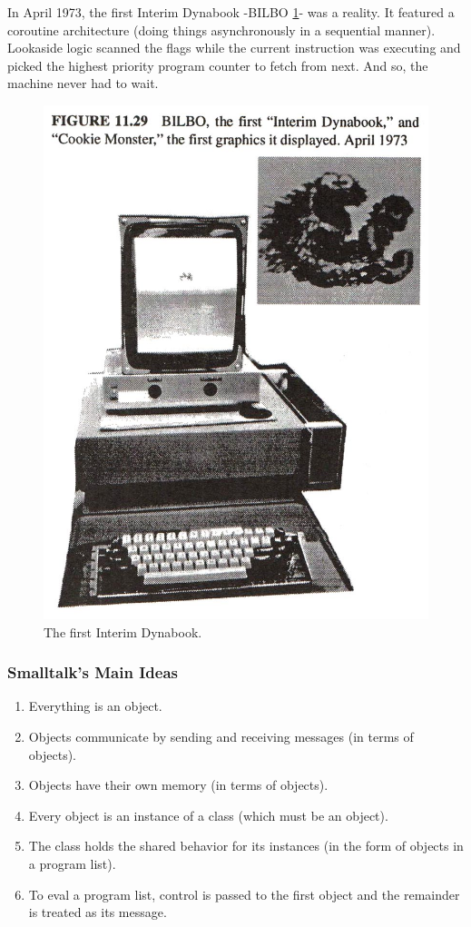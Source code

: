 \documentclass[letterpaper,12pt,parskip=full]{article}
\begin{document}
In April 1973, the first Interim Dynabook -BILBO \ref{fig:bilbo}- was a reality. It featured a coroutine architecture (doing things asynchronously in a sequential manner). Lookaside logic scanned the flags while the current instruction was executing and picked the highest priority program counter to fetch from next. And so, the machine never had to wait.
 \begin{figure}[ht]
        \centering \includegraphics[scale=0.45]{BILBO.jpg}
        \caption{
                \label{fig:bilbo}
                The first Interim Dynabook.
        }
\end{figure}

\subsubsection{Smalltalk's Main Ideas}

\begin{enumerate}
    \item Everything is an object.
    \item Objects communicate by sending and receiving messages (in terms of objects).
    \item Objects have their own memory (in terms of objects).
    \item Every object is an instance of a class (which must be an object).
    \item The class holds the shared behavior for its instances (in the form of objects in a program list).
    \item To eval a program list, control is passed to the first object and the remainder is treated as its message.
\end{enumerate}
\end{document}
